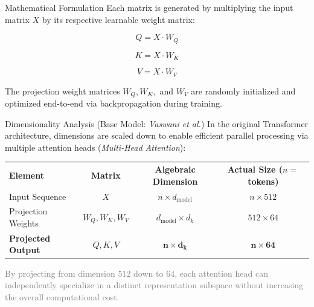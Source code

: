 \documentclass[aspectratio=169]{beamer}
\begin{document}
\begin{frame}{Mathematical Formulation}
	Each matrix is generated by multiplying the input matrix $X$ by its respective learnable weight matrix:
	
	\begin{equation}
			Q = X \cdot W_Q
	\end{equation}

	\begin{equation}
			K = X \cdot W_K
\end{equation}

	\begin{equation}
			V = X \cdot W_V
\end{equation}	
	
The projection weight matrices $W_Q, W_K,$ and $W_V$ are randomly initialized and optimized end-to-end via backpropagation during training.
\end{frame}


\begin{frame}{Dimensionality Analysis (Base Model: \textit{Vaswani et al.})}
	In the original Transformer architecture, dimensions are scaled down to enable efficient parallel processing via multiple attention heads (\textit{Multi-Head Attention}):
	
	\vspace{0.4cm}
	\centering
	\begin{tabular}{lccc}
		\textbf{Element} & \textbf{Matrix} & \textbf{Algebraic Dimension} & \textbf{Actual Size ($n = $ tokens)} \\
		Input Sequence & $X$ & $n \times d_{\text{model}}$ & $n \times 512$ \\
		Projection Weights & $W_Q, W_K, W_V$ & $d_{\text{model}} \times d_k$ & $512 \times 64$ \\
		\textbf{Projected Output} & \textbf{$Q, K, V$} & $\mathbf{n \times d_k}$ & $\mathbf{n \times 64}$ \\
	\end{tabular}
	
	\vspace{0.4cm}
	\small
	\textcolor{gray}{By projecting from dimension $512$ down to $64$, each attention head can independently specialize in a distinct representation subspace without increasing the overall computational cost.}
\end{frame}
\end{document}
